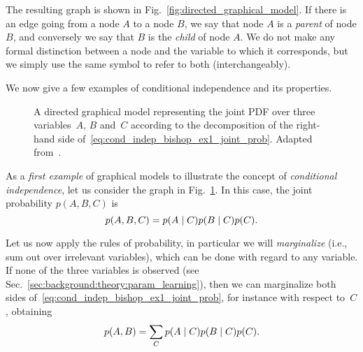 The resulting graph is shown in Fig.~\ref{fig:directed_graphical_model}.
If there is an edge going from a node $A$ to a node $B$, we say that node $A$ is a \emph{parent} of node $B$, and conversely we say that $B$ is the \emph{child} of node $A$.
We do not make any formal distinction between a node and the variable to which it corresponds, but we simply use the same symbol to refer to both (interchangeably).

We now give a few examples of conditional independence and its properties.

\begin{figure}
\centering
{}
\caption[A directed graphical model representing the joint \acf{PDF} over the variables of~\eqref{eq:cond_indep_bishop_ex1_joint_prob}.]{A directed graphical model representing the joint \acf{PDF} over three variables~$A$, $B$ and~$C$ according to the decomposition of the right-hand side of~\eqref{eq:cond_indep_bishop_ex1_joint_prob}. Adapted from~\cite{bishop:prml}.}
\label{fig:cond_indep_bishop_ex1}
\end{figure}

As a \emph{first example} of graphical models to illustrate the concept of \emph{conditional independence}, let us consider the graph in Fig.~\ref{fig:cond_indep_bishop_ex1}.
In this case, the joint probability $p(A,B,C)$ is
\begin{equation} \label{eq:cond_indep_bishop_ex1_joint_prob}
    p(A,B,C) = p(A \mid C) p(B \mid C) p(C).
\end{equation}

Let us now apply the rules of probability, in particular we will \emph{marginalize} (i.e., sum out over irrelevant variables), which can be done with regard to any variable. \label{para:marginalization}
If none of the three variables is observed (see Sec.~\ref{sec:background:theory:param_learning}), then we can marginalize both sides of~\eqref{eq:cond_indep_bishop_ex1_joint_prob}, for instance with respect to~$C$, obtaining
\begin{equation*}
  p(A,B) = \sum_C p(A \mid C) p(B \mid C) p(C).
\end{equation*}


